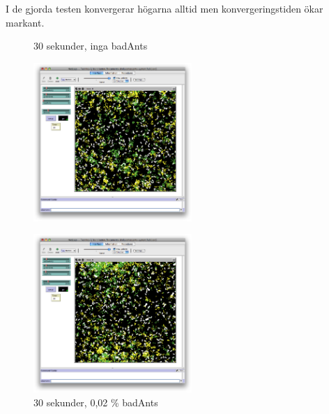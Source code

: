 \documentclass[titlepage, a4paper, 12pt]{article}
\begin{document}
I de gjorda testen konvergerar högarna alltid men konvergeringstiden
ökar markant.

\begin{figure}
  \begin{minipage}[b]{0.5\linewidth} %
    \centering
    \caption{30 sekunder, inga badAnts}\label{fig:first-conv-pic}
    \includegraphics[width=6cm]{images/no-bad-30.png}
  \end{minipage}
  \hspace{0.5cm} %
  \begin{minipage}[b]{0.5\linewidth}
    \centering
    \caption{30 sekunder, 0,02 \% badAnts}
    \includegraphics[width=6cm]{images/10-bad-30.png}
  \end{minipage}


\end{figure}
\end{document}
